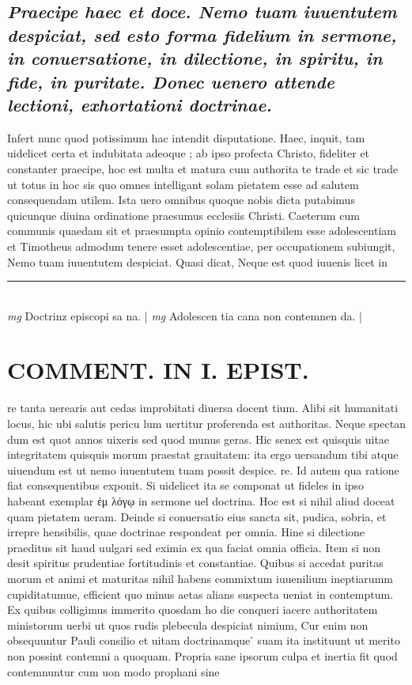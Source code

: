 \documentclass{article}
\begin{document}
\begin{pages}
\subsection*{\textit{Praecipe haec et doce. Nemo tuam iuuentutem despiciat, sed esto forma fidelium in sermone, in conuersatione, in dilectione, in spiritu, in fide, in puritate. Donec uenero attende lectioni, exhortationi doctrinae. }}\pstart Infert nunc quod potissimum hac intendit disputatione. Haec, inquit, tam uidelicet certa et indubitata adeoque ; ab ipso profecta Christo, fideliter et constanter praecipe, hoc est multa et matura cum authorita te trade et sic trade ut totus in hoc sis quo omnes intelligant solam pietatem esse ad salutem consequendam utilem. Ista uero omnibus quoque nobis dicta putabimus quicunque diuina ordinatione praesumus ecclesiis Christi. Caeterum cum communis quaedam sit et praesumpta opinio contemptibilem esse adolescentiam et Timotheus admodum tenere esset adolescentiae, per occupationem subiungit, Nemo tuam iuuentutem despiciat. Quasi dicat, Neque est quod iuuenis licet in  \pend
\vspace{0.5cm}\noindent
\vspace{0.2cm}\rule{1cm}{0.2pt}\\ 
\hspace{0.2cm}\textit{mg}
\footnotesize Doctrinz episcopi sa na. 
\normalsize| 
\hspace{0.2cm}\textit{mg}
\footnotesize Adolescen tia cana non contemnen da. 
\normalsize| 
\section*{COMMENT. IN I. EPIST. }\pstart re tanta uerearis aut cedas improbitati diuersa docent tium. Alibi sit humanitati locus, hic ubi salutis pericu lum uertitur proferenda est authoritas. Neque spectan dum est quot annos uixeris sed quod munus geras. Hic senex est quisquis uitae integritatem quisquis morum praestat grauitatem: ita ergo uersandum tibi atque uiuendum est ut nemo iuuentutem tuam possit despice. re. Id autem qua ratione fiat consequentibus exponit. Si uidelicet ita se componat ut fideles in ipso habeant exemplar ἐμ λόγῳ in sermone uel doctrina. Hoc est si nihil aliud doceat quam pietatem ueram. Deinde si conuersatio eius sancta sit, pudica, sobria, et irrepre hensibilis, quae doctrinae respondeat per omnia. Hine si dilectione praeditus sit haud uulgari sed eximia ex qua faciat omnia officia. Item si non desit spiritus prudentiae fortitudinis et constantiae. Quibus si accedat puritas morum et animi et maturitas nihil habens commixtum iuuenilium ineptiarumm cupiditatumue, efficient quo minus aetas alians suspecta ueniat in contemptum. Ex quibus colligimus immerito quosdam ho die conqueri iacere authoritatem ministorum uerbi ut quos rudis plebecula despiciat nimium, Cur enim non obsequuntur Pauli consilio et uitam doctrinamque ́ suam ita instituunt ut merito non possint contemni a quoquam. Propria sane ipsorum culpa et inertia fit quod contemnuntur cum uon modo prophani sine  \pend

\end{pages}
\end{document}
